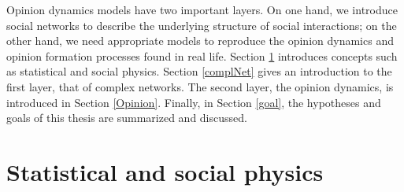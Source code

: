\documentclass[11 pt , letterpaper , twoside , openright]{book}
\begin{document}
\newline
Opinion dynamics models have two important layers. On one hand, we introduce social networks to describe the underlying structure of social interactions; on the other hand, we need appropriate models to reproduce the opinion dynamics and opinion formation processes found in real life.
\newpage
\noindent
Section \ref{statPhys} introduces concepts such as statistical and social physics. Section \ref{complNet} gives an introduction to the first layer, that of complex networks. The second layer, the opinion dynamics, is introduced in Section \ref{Opinion}. Finally, in Section \ref{goal}, the hypotheses and goals of this thesis are summarized and discussed.

\section{Statistical and social physics}\label{statPhys}
\end{document}
